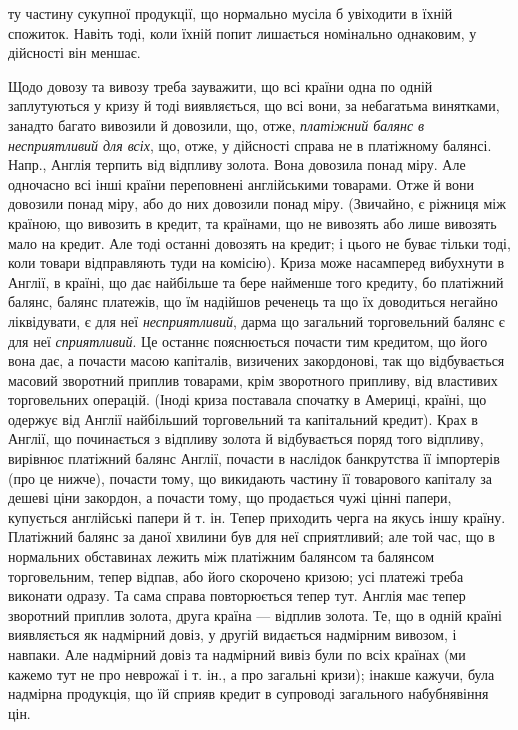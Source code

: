 \parcont{}  %
ту частину сукупної продукції, що нормально мусіла б увіходити в їхній спожиток.
Навіть тоді, коли їхній попит лишається номінально однаковим, у дійсності він
меншає.

Щодо довозу та вивозу треба зауважити, що всі країни одна по одній
заплутуються у кризу й тоді виявляється, що всі вони, за небагатьма винятками,
занадто багато вивозили й довозили, що, отже, \emph{платіжний балянс в несприятливий
для всіх}, що, отже, у дійсності справа не в платіжному балянсі.
Напр., Англія терпить від відпливу золота. Вона довозила понад міру. Але одночасно
всі інші країни переповнені англійськими товарами. Отже й вони довозили
понад міру, або до них довозили понад міру. (Звичайно, є ріжниця між країною,
що вивозить в кредит, та країнами, що не вивозять або лише вивозять мало
на кредит. Але тоді останні довозять на кредит; і цього не буває тільки тоді,
коли товари відправляють туди на комісію). Криза може насамперед вибухнути
в Англії, в країні, що дає найбільше та бере найменше того кредиту, бо платіжний
балянс, балянс платежів, що їм надійшов реченець та що їх доводиться
негайно ліквідувати, є для неї \emph{несприятливий}, дарма що загальний торговельний
балянс є для неї \emph{сприятливий}. Це останнє пояснюється почасти тим
кредитом, що його вона дає, а почасти масою капіталів, визичених закордонові,
так що відбувається масовий зворотний приплив товарами, крім зворотного припливу,
від властивих торговельних операцій. (Іноді криза поставала спочатку в
Америці, країні, що одержує від Англії найбільший торговельний та капітальний
кредит). Крах в Англії, що починається з відпливу золота й відбувається поряд того
відпливу, вирівнює платіжний балянс Англії, почасти в наслідок банкрутства її
імпортерів (про це нижче), почасти тому, що викидають частину її товарового капіталу
за дешеві ціни закордон, а почасти тому, що продається чужі цінні папери,
купується англійські папери й т. ін. Тепер приходить черга на якусь іншу
країну. Платіжний балянс за даної хвилини був для неї сприятливий; але той
час, що в нормальних обставинах лежить між платіжним балянсом та балянсом
торговельним, тепер відпав, або його скорочено кризою; усі платежі треба виконати
одразу. Та сама справа повторюється тепер тут. Англія має тепер зворотний
приплив золота, друга країна — відплив золота. Те, що в одній країні виявляється
як надмірний довіз, у другій видається надмірним вивозом, і навпаки. Але надмірний
довіз та надмірний вивіз були по всіх країнах (ми кажемо тут не про
неврожаї і т. ін., а про загальні кризи); інакше кажучи, була надмірна продукція,
що їй сприяв кредит в супроводі загального набубнявіння цін.

